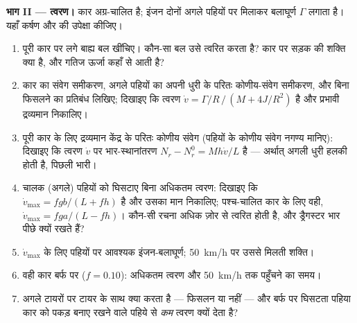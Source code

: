\begin{problem}
\medskip
\noindent\textbf{भाग II --- त्वरण।}
कार अग्र-चालित है; इंजन दोनों अगले पहियों पर मिलाकर बलाघूर्ण $\Gamma$
लगाता है। यहाँ कर्षण और  की उपेक्षा कीजिए।
\begin{enumerate}[resume]
  \item पूरी कार पर लगे बाह्य बल खींचिए। कौन-सा बल उसे
        त्वरित करता है? कार पर सड़क की शक्ति क्या है, और
        गतिज ऊर्जा कहाँ से आती है?
  \item कार का संवेग समीकरण, अगले पहियों का अपनी धुरी के परितः
        कोणीय-संवेग समीकरण, और बिना फिसलने का
        प्रतिबंध लिखिए; दिखाइए कि त्वरण $\dot v =
        \Gamma/R\,/\,(M + 4J/R^2)$ है और प्रभावी द्रव्यमान निकालिए।
  \item पूरी कार के लिए द्रव्यमान केंद्र के परितः कोणीय संवेग
        (पहियों के कोणीय संवेग नगण्य मानिए): दिखाइए कि
        त्वरण $\dot v$ पर भार-स्थानांतरण $N_r - N_r^0 =
        Mh\dot v/L$ है --- अर्थात् अगली धुरी हलकी होती है, पिछली भारी।
  \item चालक (अगले) पहियों को घिसटाए बिना अधिकतम त्वरण:
        दिखाइए कि $\dot v_{\max} = fgb/(L + fh)$ है और उसका मान
        निकालिए; पश्च-चालित कार के लिए वही, $\dot v_{\max} =
        fga/(L - fh)$। कौन-सी रचना अधिक ज़ोर से त्वरित होती है, और
        ड्रैगस्टर भार पीछे क्यों रखते हैं?
  \item $\dot v_{\max}$ के लिए पहियों पर आवश्यक इंजन-बलाघूर्ण;
        \qty{50}{km/h} पर उससे मिलती शक्ति।
  \item वही कार बर्फ पर ($f = 0.10$): अधिकतम त्वरण और
        \qty{50}{km/h} तक पहुँचने का समय।
  \item अगले टायरों पर  टायर के साथ क्या करता है
        --- फिसलन या नहीं --- और बर्फ पर घिसटता पहिया कार को पकड़ बनाए
        रखने वाले पहिये से \emph{कम} त्वरण क्यों देता है?
\end{enumerate}


\end{problem}
